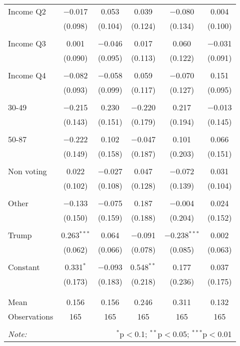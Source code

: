 \begin{tabular}{@{\extracolsep{5pt}}lccccc}
 Income Q2 & $-$0.017 & 0.053 & 0.039 & $-$0.080 & 0.004 \\ 
  & (0.098) & (0.104) & (0.124) & (0.134) & (0.100) \\ 
  & & & & & \\ 
 Income Q3 & 0.001 & $-$0.046 & 0.017 & 0.060 & $-$0.031 \\ 
  & (0.090) & (0.095) & (0.113) & (0.122) & (0.091) \\ 
  & & & & & \\ 
 Income Q4 & $-$0.082 & $-$0.058 & 0.059 & $-$0.070 & 0.151 \\ 
  & (0.093) & (0.099) & (0.117) & (0.127) & (0.095) \\ 
  & & & & & \\ 
 30-49 & $-$0.215 & 0.230 & $-$0.220 & 0.217 & $-$0.013 \\ 
  & (0.143) & (0.151) & (0.179) & (0.194) & (0.145) \\ 
  & & & & & \\ 
 50-87 & $-$0.222 & 0.102 & $-$0.047 & 0.101 & 0.066 \\ 
  & (0.149) & (0.158) & (0.187) & (0.203) & (0.151) \\ 
  & & & & & \\ 
 Non voting & 0.022 & $-$0.027 & 0.047 & $-$0.072 & 0.031 \\ 
  & (0.102) & (0.108) & (0.128) & (0.139) & (0.104) \\ 
  & & & & & \\ 
 Other & $-$0.133 & $-$0.075 & 0.187 & $-$0.004 & 0.024 \\ 
  & (0.150) & (0.159) & (0.188) & (0.204) & (0.152) \\ 
  & & & & & \\ 
 Trump & 0.263$^{***}$ & 0.064 & $-$0.091 & $-$0.238$^{***}$ & 0.002 \\ 
  & (0.062) & (0.066) & (0.078) & (0.085) & (0.063) \\ 
  & & & & & \\ 
 Constant & 0.331$^{*}$ & $-$0.093 & 0.548$^{**}$ & 0.177 & 0.037 \\ 
  & (0.173) & (0.183) & (0.218) & (0.236) & (0.175) \\ 
  & & & & & \\ 
\hline \\[-1.8ex] 
Mean & 0.156 & 0.156 & 0.246 & 0.311 & 0.132 \\ 
Observations & 165 & 165 & 165 & 165 & 165 \\ 
\hline 
\hline \\[-1.8ex] 
\textit{Note:}  & \multicolumn{5}{r}{$^{*}$p$<$0.1; $^{**}$p$<$0.05; $^{***}$p$<$0.01} \\ 
\end{tabular} 
